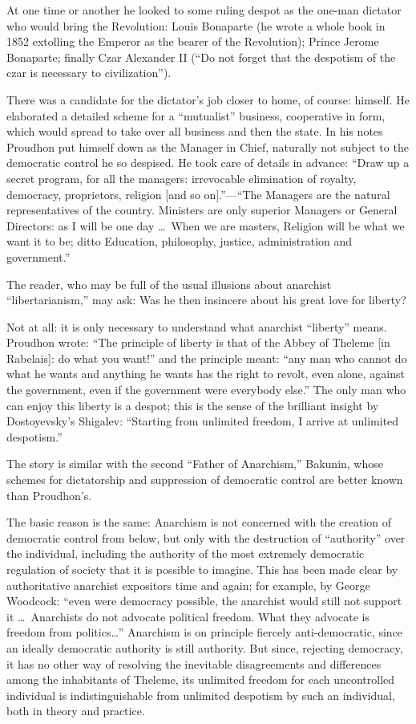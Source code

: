 At one time or another he looked to some ruling despot as the one-man dictator who would bring the Revolution: Louis Bonaparte (he wrote a whole book in 1852 extolling the Emperor as the bearer of the Revolution); Prince Jerome Bonaparte; finally Czar Alexander II (``Do not forget that the despotism of the czar is necessary to civilization'').

There was a candidate for the dictator's job closer to home, of course: himself. He elaborated a detailed scheme for a ``mutualist'' business, cooperative in form, which would spread to take over all business and then the state. In his notes Proudhon put himself down as the Manager in Chief, naturally not subject to the democratic control he so despised. He took care of details in advance: ``Draw up a secret program, for all the managers: irrevocable elimination of royalty, democracy, proprietors, religion [and so on].''---``The Managers are the natural representatives of the country. Ministers are only superior Managers or General Directors: as I will be one day \ldots\ When we are masters, Religion will be what we want it to be; ditto Education, philosophy, justice, administration and government.''

The reader, who may be full of the usual illusions about anarchist ``libertarianism,'' may ask: Was he then insincere about his great love for liberty?

Not at all: it is only necessary to understand what anarchist ``liberty'' means. Proudhon wrote: ``The principle of liberty is that of the Abbey of Theleme [in Rabelais]: do what you want!'' and the principle meant: ``any man who cannot do what he wants and anything he wants has the right to revolt, even alone, against the government, even if the government were everybody else.'' The only man who can enjoy this liberty is a despot; this is the sense of the brilliant insight by Dostoyevsky's Shigalev: ``Starting from unlimited freedom, I arrive at unlimited despotism.''

The story is similar with the second ``Father of Anarchism,'' Bakunin, whose schemes for dictatorship and suppression of democratic control are better known than Proudhon's.

The basic reason is the same: Anarchism is not concerned with the creation of democratic control from below, but only with the destruction of ``authority'' over the individual, including the authority of the most extremely democratic regulation of society that it is possible to imagine. This has been made clear by authoritative anarchist expositors time and again; for example, by George Woodcock: ``even were democracy possible, the anarchist would still not support it \ldots\ Anarchists do not advocate political freedom. What they advocate is freedom from politics\ldots'' Anarchism is on principle fiercely anti-democratic, since an ideally democratic authority is still authority. But since, rejecting democracy, it has no other way of resolving the inevitable disagreements and differences among the inhabitants of Theleme, its unlimited freedom for each uncontrolled individual is indistinguishable from unlimited despotism by such an individual, both in theory and practice.

